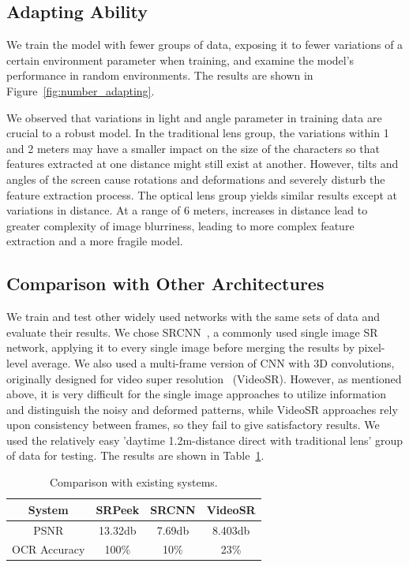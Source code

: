 \subsection{Adapting Ability}
We train the model with fewer groups of data, exposing it to fewer variations of a certain environment parameter when training, and examine the model's performance in random environments. The results are shown in Figure~\ref{fig:number_adapting}.

We observed that variations in light and angle parameter in training data are crucial to a robust model. In the traditional lens group, the variations within 1 and 2 meters may have a smaller impact on the size of the characters
 so that features extracted at one distance might still exist at another.
 However, tilts and angles of the screen cause rotations and deformations and severely disturb the feature extraction process. The optical lens group yields similar results except at variations in distance. At a range of 6 meters, increases in distance lead to greater complexity of image blurriness, leading to more complex feature extraction and a more fragile model.

\subsection{Comparison with Other Architectures}
We train and test other widely used networks with the same sets of data and evaluate their results. We chose SRCNN~\cite{dong2015image}, a commonly used single image SR network, applying it to every single image before merging the results by pixel-level average. We also used a multi-frame version of CNN with 3D convolutions, originally designed for video super resolution~\cite{kappeler2016video} (VideoSR). However, as mentioned above, it is very difficult for the single image approaches to utilize information and distinguish the noisy and deformed patterns, while VideoSR approaches rely upon consistency between frames, so they fail to give satisfactory results. We used the relatively easy 'daytime 1.2m-distance direct with traditional lens' group of data for testing. The results are shown in Table~\ref{table-comp}.
\begin{table}[!t]
    \centering
    \caption{Comparison with existing systems.}
    \begin{tabular}{@{}cccc@{}}
        \toprule
    System & SRPeek & SRCNN & VideoSR \\ \midrule
    PSNR & 13.32db & 7.69db & 8.403db\\ 
    OCR Accuracy & 100\% & 10\% & 23\%\\ \bottomrule
    \end{tabular}
    \label{table-comp}
\end{table}

